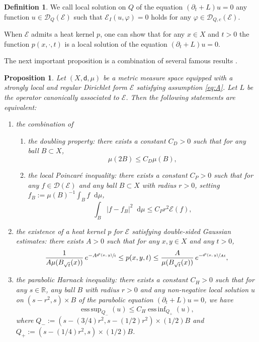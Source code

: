 \documentclass[JEP,XML,SOM,Unicode,published]{cedram}
\theoremstyle{plain}
\newtheorem{proposition}[theorem]{Proposition}
\theoremstyle{definition}
\newtheorem{definition}[theorem]{Definition}
\newcommand{\setR}{\mathbb{R}}
\newcommand{\cE}{\mathcal{E}}
\newcommand{\cD}{\mathcal{D}}
\let\phi\varphi
\newcommand{\di}{\mathop{}\!\mathrm{d}}
\newcommand{\dist}{\mathsf{d}}
\DeclareMathOperator*{\essssup}{ess\,sup}
\DeclareMathOperator*{\esssinf}{ess\,inf}
\begin{document}
\begin{definition}
We call local solution on $Q$ of the equation $(\partial_t+L)u = 0$ any function $u \in \cD_Q(\cE)$ such that $\cE_I(u,\phi)=0$ holds for any $\phi \in \cD_{Q,c}(\cE)$.
\end{definition}

When $\cE$ admits a heat kernel $p$, one can show that for any $x \in X$ and $t>0$ the function $p(x,\cdot,t)$ is a local solution of the equation $(\partial_t+L)u=0$.

The next important proposition is a combination of several famous results \cite{Grigor'yan92,Saloff-Coste,Sturm3}.

\begin{proposition}\label{prop:important}
Let $(X,\dist,\mu)$ be a metric measure space equipped with a strongly local and regular Dirichlet form $\cE$ satisfying assumption \eqref{eq:A}. Let $L$ be the operator canonically associated to $\cE$. Then the following statements are equivalent:
\begin{enumerate}
\item the combination of

\begin{enumerate}
\item
the doubling property: there exists a constant $C_D>0$ such that for any ball $B \subset X$,
\begin{equation}\label{eq:doubling}
\mu(2B)\le C_D \mu(B),
\end{equation}

\item
the local Poincaré inequality: there exists a constant $C_P>0$ such that for any $f \in \cD(\cE)$ and any ball $B \subset X$ with radius $r>0$, setting $f_B:= \mu(B)^{-1}\int_B f \di \mu$,
\begin{equation}\label{eq:Poincare}
\int_B |f-f_B|^2 \di \mu \le C_P r^2 \cE(f),
\end{equation}
\end{enumerate}

\item the existence of a heat kernel $p$ for $\cE$ satisfying double-sided Gaussian estimates: there exists $A>0$ such that for any $x,y \in X$ and any $t>0$,
\begin{equation}\label{eq:LiYau}
\frac{1}{A \mu(B_{\sqrt{t}}(x))}\, e^{-A\sfrac{\dist^2(x,y)}{t}} \le p(x,y,t) \le \frac{A}{\mu(B_{\sqrt{t}}(x))}\, e^{-\sfrac{\dist^2(x,y)}{At}},
\end{equation}

\item the parabolic Harnack inequality: there exists a constant $C_H>0$ such that for any $s\in \setR$, any ball $B$ with radius $r>0$ and any non-negative local solution $u$ on $(s-r^2,s)\times B$ of the parabolic equation $(\partial_t + L)u=0$, we have
\begin{equation}\label{eq:parabolicHarnack}
\essssup_{Q_-} (u) \le C_H \esssinf_{Q_+} (u),
\end{equation}
where $Q_-:=(s-(3/4)r^2,s-(1/2)r^2) \times (1/2)B$ and $Q_+:=(s-(1/4)r^2,s)\times (1/2)B$.
\end{enumerate}
\end{proposition}
\end{document}
